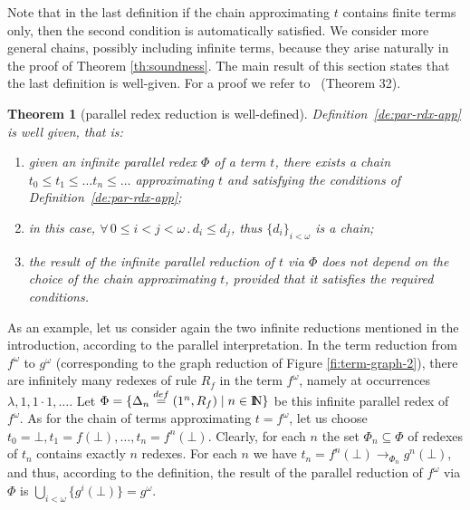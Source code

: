 \documentclass{eptcs}
\theoremstyle{plain}
\newtheorem{theorem}{Theorem} \newtheorem{lemma}[theorem]{Lemma}
\theoremstyle{definition}
\newcommand{\nat}{{\rm I\!l\!\!N}}
\begin{document}
Note that in the last definition if the chain approximating $t$
contains finite terms only, then the second condition is automatically
satisfied. We consider more general chains, possibly including
infinite terms, because they arise
naturally in the proof of Theorem \ref{th:soundness}. 
The main result of this section states that the last definition is 
well-given. For a proof we refer to~\cite{Cor:TRC} (Theorem 32).

\begin{theorem}
[parallel redex reduction is well-defined]
\label{th:WD-ParRdxApp}
Definition~\ref{de:par-rdx-app} is well given, that is:

\begin{enumerate}
\item given an infinite parallel redex $\Phi$ of a term $t$, there
  exists a chain $t_0 \le t_1 \le \ldots t_n \le \ldots$ approximating
  $t$ and satisfying the conditions of Definition~\ref{de:par-rdx-app};

\item in this case, $\forall\, 0 \leq i < j < \omega \,.\, d_i \leq
  d_j$, thus $\{d_i\}_{i<\omega}$ is a chain;

\item the result of the infinite parallel reduction of $t$ via $\Phi$
  does not depend on the choice of the chain approximating $t$,
  provided that it satisfies the required conditions.
\end{enumerate}
\end{theorem}


As an example, let us consider again the two infinite reductions 
mentioned 
in the introduction, according to the 
parallel interpretation. 
In the term reduction from $f^\omega$ to $g^\omega$ (corresponding to 
the 
graph reduction of Figure \ref{fi:term-graph-2}), 
there are infinitely many redexes of rule $R_f$ 
in the term $f^\omega$, 
namely at occurrences $\lambda,1,1\cdot 1, \ldots$. Let $\Phi = 
\{\Delta_n 
\stackrel{def}{=}(1^n, R_f)\mid 
n \in \nat\}$ be this infinite parallel redex of $f^\omega$. 
As for the chain of terms approximating 
$t=f^\omega$, let us choose  $t_0 = 
\bot, t_1= f(\bot),\ldots, t_n = f^n(\bot)$. Clearly, for each $n$  
the set $\Phi_n \subseteq \Phi$ of redexes of $t_n$ contains exactly 
$n$ 
redexes. 
For each $n$ we have $t_n = f^n(\bot) \rightarrow_{\Phi_n} g^n(\bot)$, 
and thus, according 
to the definition, the result of the parallel reduction of $f^\omega$ 
via $\Phi$ is 
$\bigcup_{i<\omega}\{g^i(\bot)\} = g^\omega.$ 
\end{document}
